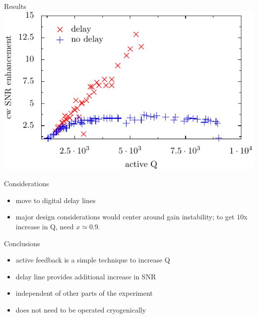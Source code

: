 \documentclass{beamer}
\begin{document}
\begin{frame}{Results}
\includegraphics[width=\textwidth]{experiment}
\end{frame}

\begin{frame}{Considerations}
\begin{itemize}
\item move to digital delay lines
\item major design considerations would center around gain instability; to get $10$x increase in Q, need $x \simeq 0.9$.
\end{itemize}
\end{frame}

\begin{frame}{Conclusions}
\begin{itemize}
\item active feedback is a simple technique to increase Q
\item delay line provides additional increase in SNR
\item independent of other parts of the experiment
\item does not need to be operated cryogenically
\end{itemize}
\end{frame}
\end{document}
